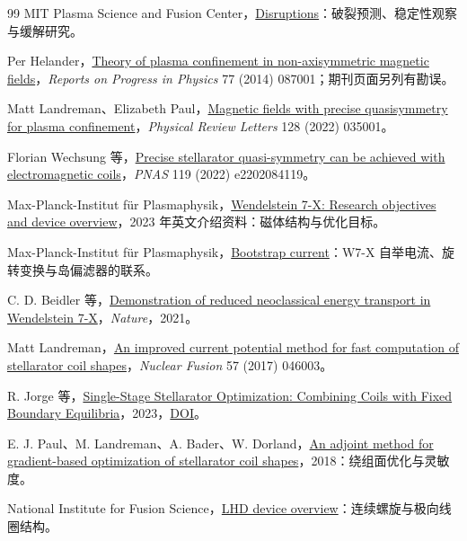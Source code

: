 \documentclass[12pt,fontset=none]{ctexart}
\numberwithin{equation}{section}
\numberwithin{table}{section}
\numberwithin{figure}{section}
\begin{document}
\begin{thebibliography}{99}
MIT Plasma Science and Fusion Center，\href{https://disruptions.mit.edu/}{Disruptions}：破裂预测、稳定性观察与缓解研究。

Per Helander，\href{https://doi.org/10.1088/0034-4885/77/8/087001}{Theory of plasma confinement in non-axisymmetric magnetic fields}，\textit{Reports on Progress in Physics} 77 (2014) 087001；期刊页面另列有勘误。

Matt Landreman、Elizabeth Paul，\href{https://arxiv.org/abs/2108.03711}{Magnetic fields with precise quasisymmetry for plasma confinement}，\textit{Physical Review Letters} 128 (2022) 035001。

Florian Wechsung 等，\href{https://doi.org/10.1073/pnas.2202084119}{Precise stellarator quasi-symmetry can be achieved with electromagnetic coils}，\textit{PNAS} 119 (2022) e2202084119。

Max-Planck-Institut f\"ur Plasmaphysik，\href{https://www.ipp.mpg.de/3766317/W7X_en_2023.pdf}{Wendelstein 7-X: Research objectives and device overview}，2023 年英文介绍资料：磁体结构与优化目标。

Max-Planck-Institut f\"ur Plasmaphysik，\href{https://www.ipp.mpg.de/4631577/Bootstrap-current}{Bootstrap current}：W7-X 自举电流、旋转变换与岛偏滤器的联系。

C. D. Beidler 等，\href{https://doi.org/10.1038/s41586-021-03687-w}{Demonstration of reduced neoclassical energy transport in Wendelstein 7-X}，\textit{Nature}，2021。

Matt Landreman，\href{https://arxiv.org/abs/1609.04378}{An improved current potential method for fast computation of stellarator coil shapes}，\textit{Nuclear Fusion} 57 (2017) 046003。

R. Jorge 等，\href{https://arxiv.org/abs/2302.10622}{Single-Stage Stellarator Optimization: Combining Coils with Fixed Boundary Equilibria}，2023，\href{https://doi.org/10.1088/1361-6587/acd957}{DOI}。

E. J. Paul、M. Landreman、A. Bader、W. Dorland，\href{https://arxiv.org/abs/1801.04317}{An adjoint method for gradient-based optimization of stellarator coil shapes}，2018：绕组面优化与灵敏度。

National Institute for Fusion Science，\href{https://soken.nifs.ac.jp/archives/about/program_eng}{LHD device overview}：连续螺旋与极向线圈结构。


\end{thebibliography}
\end{document}
